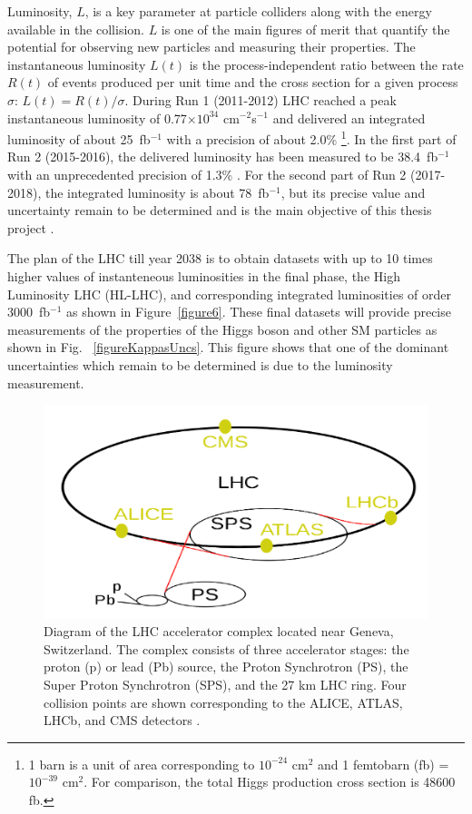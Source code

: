 \documentclass[final,12pt]{article}
\newcommand{\lumi}[1]{{#1~fb$^{-1}$}}
\newcommand{\instlumi}[1]{#1$\times 10^{34}$ cm$^{-2}$s$^{-1}$}
\begin{document}
Luminosity, $L$, is a key parameter at particle colliders along with the energy available in the collision.
$L$ is one of the  main figures of merit that quantify the potential for observing new particles and measuring their properties.
The instantaneous luminosity $L(t)$ is the process-independent ratio between the rate $R(t)$ of events produced per unit time and the cross section for a given process $\sigma$: $L(t) = R(t)/\sigma$.
During Run 1 (2011-2012) LHC reached a peak instantaneous luminosity of \instlumi{0.77} and delivered an integrated luminosity of about \lumi{25} with a precision of about 2.0\% 
\footnote{1 barn is a unit of area corresponding to $10^{-24}$ cm${^2}$ and 1 femtobarn (fb) = $10^{-39}$ cm$^{2}$.
For comparison, the total Higgs production cross section is 48600 fb.}.
In the first part of Run 2 (2015-2016), the delivered luminosity has been measured to be \lumi{38.4} with an unprecedented precision of 1.3\% \cite{Sirunyan:2021qkt}.
For the second part of Run 2 (2017-2018), the integrated luminosity is about \lumi{78}, but its precise value and uncertainty remain to be determined and is the main objective of this thesis project \cite{CMS:2018elu}.

The plan of the LHC till year 2038 is to obtain datasets with up to 10 times higher values of instanteneous luminosities in the final phase, the  High Luminosity LHC (HL-LHC), and corresponding integrated luminosities of order \lumi{3000} as shown in Figure~\ref{figure6}.
These final datasets will provide  precise measurements of the properties of the Higgs boson and other SM particles as shown in Fig. ~\ref{figureKappasUncs}.
This figure shows that one of the dominant uncertainties which remain to be determined is due to the luminosity measurement.



\begin{figure}[H]
  \centering
  \includegraphics[width=0.7\columnwidth]{./LHCcomplex.png}
  \caption{Diagram of the LHC accelerator complex located near Geneva, Switzerland. The complex consists of three accelerator stages: the proton (p) or lead (Pb) source, the Proton Synchrotron (PS), the Super Proton Synchrotron (SPS), and the 27 km LHC ring. Four collision points are shown corresponding to the ALICE, ATLAS, LHCb, and CMS detectors  \cite{Mobs:2684277}. }
  \label{figure5}
\end{figure}
\end{document}
